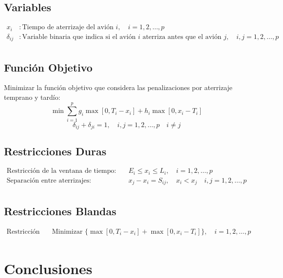 \documentclass[letter, 10pt]{article}
\begin{document}
\subsection{Variables}
\begin{align*}
x_i & : \text{Tiempo de aterrizaje del avi\'on } i, \quad i = 1,2,\ldots,p \\
\delta_{ij} & : \text{Variable binaria que indica si el avi\'on } i \text{ aterriza antes que el avi\'on } j, \quad i,j = 1,2,\ldots,p \\
\end{align*}


\subsection{Funci\'on Objetivo}
Minimizar la funci\'on objetivo que considera las penalizaciones por aterrizaje temprano y tard\'io:
\[
\min \sum_{i=1}^{p} g_i\max[0,T_i - x_i] + h_i\max[0,x_i - T_i]
\]
\[
\delta_{ij} + \delta_{ji} = 1, \quad i,j = 1,2,\ldots,p \quad i \neq j
\]

\subsection{Restricciones Duras}
\begin{align*}
\text{Restricci\'on de la ventana de tiempo:} & \quad E_i \leq x_i \leq L_i, \quad i = 1,2,\ldots,p \\
\text{Separaci\'on entre aterrizajes:} & \quad x_j - x_i = S_{ij},\quad x_i < x_j \quad i, j = 1,2,\ldots,p \\
\end{align*}

\subsection{Restricciones Blandas}
\begin{align*}
\text{Restricci\'on de aterrizaje ideal:} & \quad \text{Minimizar } \{\max[0,T_i - x_i] + \max[0,x_i - T_i]\}, \quad i = 1,2,\ldots,p \\
\end{align*}
\section{Conclusiones}
\begin{comment}
Conclusiones RELEVANTES del estudio realizado. Deber\'ia responder a las preguntas: ?`todas las t\'ecnicas resuelven el mismo problema o hay algunas diferencias?, ?`En qu\'e se parecen o difieren las t\'ecnicas en el contexto del problema?, ?`qu\'e limitaciones tienen?, ?`qu\'e t\'ecnicas o estrategias son las m\'as prometedoras?, ?`existe trabajo futuro por realizar?, ?`qu\'e ideas usted propone como lineamientos para continuar con investigaciones futuras?
\end{comment}
\end{document}
